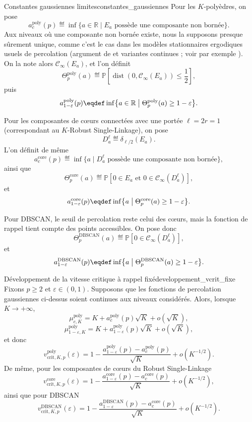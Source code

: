 \begin{Definition}{Constantes gaussiennes limites}{constantes_gaussiennes}
Pour les $K$-polyèdres, on pose
\[
    a_c^{\mathrm{poly}}(p)
    \eqdef
    \inf\{a\in\mathbb R \mid E_a\text{ possède une composante non bornée}\}.
\]
Aux niveaux où une composante non bornée existe, nous la supposons presque sûrement unique, comme c'est le cas dans les modèles stationnaires ergodiques usuels de percolation (argument de  et variantes continues ; voir par exemple \cite{MeesterRoy, Grimmett1999}). On la note alors $\mathcal C_\infty(E_a)$, et l'on définit
\[
    \Theta_p^{\mathrm{poly}}(a)
    \eqdef
    \mathbb P\left[
        \operatorname{dist}\left(0,\mathcal C_\infty(E_a)\right)\le\frac12
    \right],
\]
puis
\[
    a_{1-\varepsilon}^{\mathrm{poly}}(p)
    \eqdef
    \inf\bigl\{a \in \mathbb R \bigm|\Theta_p^{\mathrm{poly}}(a)\ge1-\varepsilon\bigr\}.
\]

Pour les composantes de cœurs connectées avec une portée $\ell=2r=1$ (correspondant au $K$-Robust Single-Linkage), on pose
\[
    D_a^\ell\eqdef\delta_{\ell/2}(E_a).
\]
L'on définit de même
\[
    a_c^{\mathrm{core}}(p)
    \eqdef
    \inf\{a \mid D_a^\ell\text{ possède une composante non bornée}\},
\]
ainsi que
\[
    \Theta_p^{\mathrm{core}}(a)
    \eqdef
    \mathbb P\left[
        0\in E_a
        \text{ et }
        0\in\mathcal C_\infty(D_a^\ell)
    \right],
\]
et
\[
    a_{1-\varepsilon}^{\mathrm{core}}(p)
    \eqdef
    \inf\bigl\{a \bigm|\Theta_p^{\mathrm{core}}(a)\ge1-\varepsilon\bigr\}.
\]

Pour DBSCAN, le seuil de percolation reste celui des cœurs, mais la fonction de rappel tient compte des points accessibles. On pose donc
\[
    \Theta_p^{\mathrm{DBSCAN}}(a)
    \eqdef
    \mathbb P\left[
        0\in\mathcal C_\infty(D_a^\ell)
    \right],
\]
et
\[
    a_{1-\varepsilon}^{\mathrm{DBSCAN}}(p)
    \eqdef
    \inf\bigl\{a \bigm|\Theta_p^{\mathrm{DBSCAN}}(a)\ge1-\varepsilon\bigr\}.
\]
\end{Definition}

\begin{Theoreme}{Développement de la vitesse critique à rappel fixé}{developpement_vcrit_fixe}
Fixons $p\ge2$ et $\varepsilon\in(0,1)$. Supposons que les fonctions de percolation gaussiennes ci-dessus soient continues aux niveaux considérés. Alors, lorsque $K\to+\infty$,
\[
    \mu_{c,K}^{\mathrm{poly}}
    =
    K+a_c^{\mathrm{poly}}(p)\sqrt K+o(\sqrt K),
\]
\[
    \mu_{1-\varepsilon,K}^{\mathrm{poly}}
    =
    K+a_{1-\varepsilon}^{\mathrm{poly}}(p)\sqrt K+o(\sqrt K),
\]
et donc
\[
    v_{\mathrm{crit},K,p}^{\mathrm{poly}}(\varepsilon)
    =
    1-
    \frac{
        a_{1-\varepsilon}^{\mathrm{poly}}(p)-a_c^{\mathrm{poly}}(p)
    }{\sqrt K}
    +o(K^{-1/2}).
\]
De même, pour les composantes de cœurs du Robust Single-Linkage 
\[
    v_{\mathrm{crit},K,p}^{\mathrm{core}}(\varepsilon)
    =
    1-
    \frac{
        a_{1-\varepsilon}^{\mathrm{core}}(p)-a_c^{\mathrm{core}}(p)
    }{\sqrt K}
    +o(K^{-1/2}),
\]
ainsi que pour DBSCAN
\[
    v_{\mathrm{crit},K,p}^{\mathrm{DBSCAN}}(\varepsilon)
    =
    1-
    \frac{
        a_{1-\varepsilon}^{\mathrm{DBSCAN}}(p)-a_c^{\mathrm{core}}(p)
    }{\sqrt K}
    +o(K^{-1/2}).
\]
\end{Theoreme}


